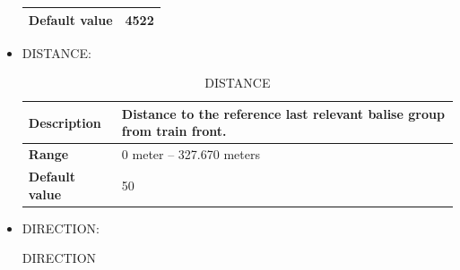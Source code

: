 \begin{itemize}
\begin{longtable}{|l|l|}
				\hline

					\begin{minipage}[t]{0.22\linewidth} \textbf{Default value} \end{minipage}
				&	\begin{minipage}[t]{0.78\linewidth} 4522 \end{minipage} \\

				\hline

			\end{longtable}

		\item DISTANCE:

			\begin{longtable}{|l|l|}
				\caption{DISTANCE}\\
				\hline

					\begin{minipage}[t]{0.22\linewidth} \textbf{Description} \end{minipage}
				&	\begin{minipage}[t]{0.78\linewidth} Distance to the reference last relevant balise group from train front. \end{minipage} \\

				\hline

					\begin{minipage}[t]{0.22\linewidth} \textbf{Range}	\end{minipage}
				&	\begin{minipage}[t]{0.78\linewidth} 0 meter – 327.670 meters \end{minipage} \\

				\hline

					\begin{minipage}[t]{0.22\linewidth} \textbf{Default value}	\end{minipage}
				&	\begin{minipage}[t]{0.78\linewidth} 50 \end{minipage} \\

				\hline

			\end{longtable}

		\item DIRECTION:

			\begin{longtable}{|l|l|}
				\caption{DIRECTION}\\
				\hline


\end{longtable}
\end{itemize}
